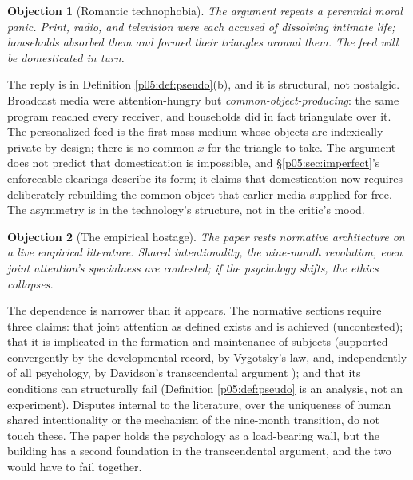 \documentclass[11pt,a4paper]{article}
\theoremstyle{seriesthm}
\newtheorem{objection}{Objection}
\newenvironment{reply}{\par\noindent{\color{lightgold}\scshape Reply.}\enspace\ignorespaces}{\par}
\begin{document}
\begin{objection}[Romantic technophobia]
The argument repeats a perennial moral panic. Print, radio, and television were each accused of dissolving intimate life; households absorbed them and formed their triangles around them. The feed will be domesticated in turn.
\end{objection}
\begin{reply}
The reply is in Definition \ref{p05:def:pseudo}(b), and it is structural, not nostalgic. Broadcast media were attention-hungry but \emph{common-object-producing}: the same program reached every receiver, and households did in fact triangulate over it. The personalized feed is the first mass medium whose objects are indexically private by design; there is no common $x$ for the triangle to take. The argument does not predict that domestication is impossible, and §\ref{p05:sec:imperfect}'s enforceable clearings describe its form; it claims that domestication now requires deliberately rebuilding the common object that earlier media supplied for free. The asymmetry is in the technology's structure, not in the critic's mood.
\end{reply}

\begin{objection}[The empirical hostage]
The paper rests normative architecture on a live empirical literature. Shared intentionality, the nine-month revolution, even joint attention's specialness are contested; if the psychology shifts, the ethics collapses.
\end{objection}
\begin{reply}
The dependence is narrower than it appears. The normative sections require three claims: that joint attention as defined exists and is achieved (uncontested); that it is implicated in the formation and maintenance of subjects (supported convergently by the developmental record, by Vygotsky's law, and, independently of all psychology, by Davidson's transcendental argument \parencite{davidson2001}); and that its conditions can structurally fail (Definition \ref{p05:def:pseudo} is an analysis, not an experiment). Disputes internal to the literature, over the uniqueness of human shared intentionality or the mechanism of the nine-month transition, do not touch these. The paper holds the psychology as a load-bearing wall, but the building has a second foundation in the transcendental argument, and the two would have to fail together.
\end{reply}
\end{document}
